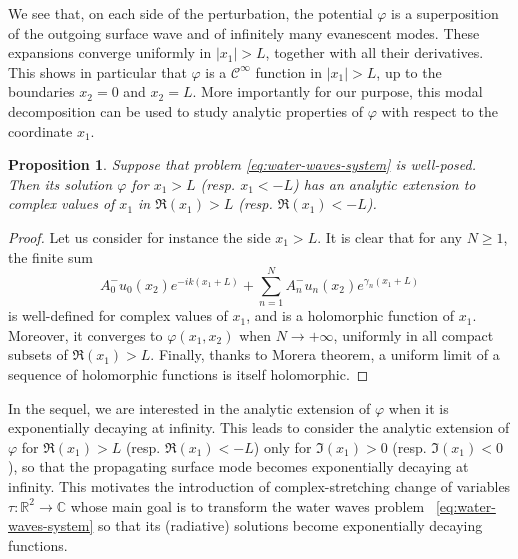 \documentclass[11pt]{article}
\newcommand{\R}{\mathbb{R}}
\newcommand{\C}{\mathbb{C}}
\newtheorem{proposition}[theorem]{Proposition}
\begin{document}
We see that, on each side of the perturbation,  the potential $\varphi$ is a
superposition of the outgoing surface wave and of infinitely many evanescent
modes. These expansions converge uniformly in $|x_1|>L$, together with all their
derivatives. This shows in particular that $\varphi$ is a $\mathcal{C}^\infty$
function in $|x_1|>L$, up to the boundaries $x_2=0$ and $x_2=L$. More
importantly for our purpose, this modal decomposition can be used to study
analytic properties of $\varphi$ with respect to the coordinate $x_1$. 
\begin{proposition}
  \label{prop:analyticity}
  Suppose that problem \cref{eq:water-waves-system} is well-posed. Then its solution $\varphi$ for $x_1>L$ (resp. $x_1<-L$)  has an analytic extension to complex values of $x_1$ in $\Re(x_1)>L$ (resp. $\Re(x_1)<-L$). 
\end{proposition}
\begin{proof}
Let us consider for instance the side $x_1>L$. 
  It is clear that for any $N \geq 1$, the finite sum $$A_0^-u_0(x_2)e^{-ik(x_1+L)}+\sum_{n= 1}^NA_n^-u_n(x_2)e^{\gamma_n(x_1+L)}$$
is well-defined for complex values of $x_1$, and is a holomorphic function of $x_1$. Moreover, it converges to $\varphi(x_1,x_2)$ when $N\to +\infty$, uniformly in all compact subsets of $\Re(x_1)>L$.  Finally, thanks to Morera theorem, a uniform limit of a sequence of holomorphic functions is itself holomorphic.
\end{proof}

In the sequel, we are interested in the analytic extension of $\varphi$ when it
is exponentially decaying at infinity. This leads to consider the analytic
extension of $\varphi$ for $\Re(x_1)>L$  (resp. $\Re(x_1)<-L$) only for
$\Im(x_1)>0$ (resp. $\Im(x_1)<0$), so that the propagating surface mode becomes
exponentially decaying at infinity. This motivates the introduction of
complex-stretching change of variables $\tau : \R^2 \to \C$ whose main goal is
to transform the water waves problem ~\cref{eq:water-waves-system} so that its
(radiative) solutions become exponentially decaying functions. 
\end{document}

